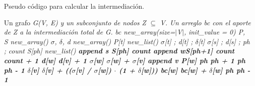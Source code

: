 \begin{algorithm}[!ht]
  \caption{Pseudo código para calcular la intermediación.}\label{alg:bet}
  \begin{algorithmic}[1]
    \Require Un grafo \it{G(V, E)} y un subconjunto de nodos \it{Z} $\subseteq$
             \it{V}.
    \Ensure Un arreglo \it{bc} con el aporte de \it{Z} a la intermediación total
            de \it{G}.
    \State \it{bc} \get \it{new\_array}(\it{size=$|$V$|$, init\_value = 0})
      \State \it{P, S} \get \it{new\_array}()
      \State \it{$\sigma$, $\delta$, d} \get \it{new\_array}()
        \State \it{P}[\it{t}] \get \it{new\_list}()
        \State $\sigma$[\it{t}] ;  \it{d}[\it{t}] ;
               $\delta$[\it{t}] 
      \EndFor
      \State $\sigma$[\it{s}] ;  \it{d}[\it{s}] ;  
             \it{ph} ; \it{count} 
      \State \it{S}[\it{ph}] \get \it{new\_list}()
      \State \bf{append} s \ra \it{S}[\it{ph}]
        \State \it{count} 
              \State \bf{append} \it{w}\ra \it{S}[\it{ph}+1]
              \State \it{count} \get \it{count} + 1
              \State \it{d}[\it{w}] \get \it{d}[\it{v}] + 1
            \EndIf
              \State $\sigma$[\it{w}] \get $\sigma$[\it{w}] + $\sigma$[\it{v}]
              \State \bf{append} \it{v} \ra \it{P}[\it{w}]
            \EndIf
          \EndFor
        \EndFor
        \State \it{ph} \get \it{ph} + 1
      \EndWhile
      \State \it{ph} \get \it{ph} - 1
            \State $\delta$[\it{v}] \get $\delta$[\it{v}] + 
                   (($\sigma$[\it{v}] / $\sigma$[\it{w}]) $\cdot$ (1 + $\delta$[\it{w}]))
          \EndFor
        \State \it{bc}[\it{w}] \get \it{bc}[\it{w}] + $\delta$[w]
        \EndFor
        \State \it{ph} \get \it{ph} - 1
      \EndWhile
    \EndFor
  \end{algorithmic}
\end{algorithm}
